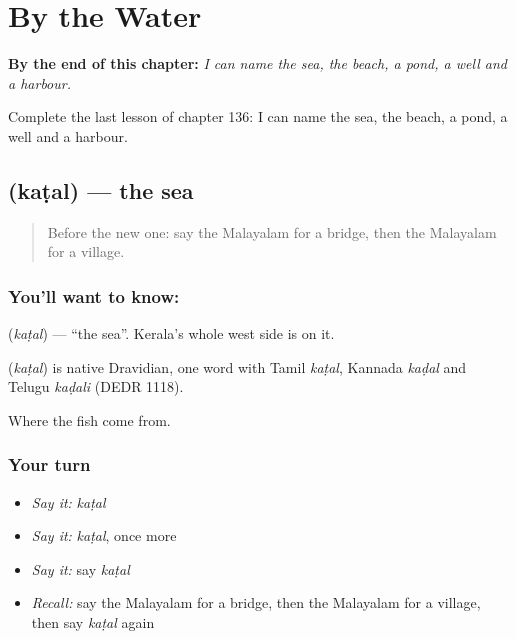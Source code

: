 
\chapter{By the Water}
\label{ch:ml-by-the-water}

\begin{chapteropening}
\textbf{By the end of this chapter:} \emph{I can name the sea, the beach, a pond, a well and a harbour.}

Complete the last lesson of chapter 136: I can name the sea, the beach, a pond, a well and a harbour.
\end{chapteropening}

\section[\texorpdfstring{\ml{കടൽ} (kaṭal)}{കടൽ (kaṭal)}]{ (kaṭal) — the sea}

\label{lesson:ML-C136-sea}



\begin{quote}
Before the new one: say the Malayalam for a bridge, then the Malayalam for a village.
\end{quote}

\subsection*{You'll want to know: }
\textbf{} (\emph{kaṭal}) — \textquotedblleft{}the sea\textquotedblright{}. Kerala's whole west side is on it.

\begin{cousinweb}
\textbf{} (\emph{kaṭal}) is native Dravidian, one word with Tamil \emph{kaṭal}, Kannada \emph{kaḍal} and Telugu \emph{kaḍali} (DEDR 1118).
\end{cousinweb}

\begin{grammarlens}[title={What you've built}]
Where the fish come from.
\end{grammarlens}

\subsection*{Your turn}
\begin{itemize}
\raggedright
  \item \emph{Say it:} \emph{kaṭal}
  \item \emph{Say it:} \emph{kaṭal}, once more
  \item \emph{Say it:} say \emph{kaṭal}
  \item \emph{Recall:} say the Malayalam for a bridge, then the Malayalam for a village, then say \emph{kaṭal} again
\end{itemize}

